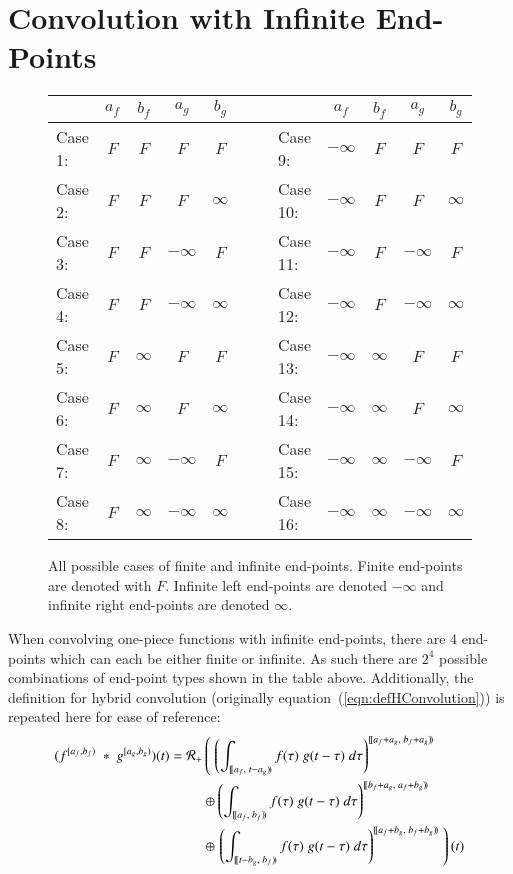 \chapter{Convolution with Infinite End-Points}
\label{chp:16cases}

\begin{figure}[h]
\caption[Possible combinations of finite and infinite end-points]{
	All possible cases of finite and infinite end-points. Finite end-points are denoted with $F$. Infinite left end-points are denoted 	
	$-\infty$ and infinite right end-points are denoted $\infty$.
	\label{fig:16cases}}
\centering
\begin{tabular}{| l || c | c | c | c || r || l ||  c | c | c | c |}
	\hline
		& $a_f$		& $b_f$		& $a_g$		& $b_g$	&$\;\;\;\;$&	& $a_f$		& $b_f$		& $a_g$		& $b_g$	\\
	\hline 
Case 1:	& $F$		& $F$		& $F$		& $F$	&&	Case 9:	& $-\infty$	& $F$		& $F$		& $F$	\\
Case 2:	& $F$		& $F$		& $F$		& $\infty$&&	Case 10:	& $-\infty$	& $F$		& $F$		& $\infty$ \\
Case 3:	& $F$		& $F$		& $-\infty$	& $F$	&&	Case 11:	& $-\infty$	& $F$		& $-\infty$	& $F$	\\
Case 4:	& $F$		& $F$		& $-\infty$	& $\infty$&&	Case 12:	& $-\infty$	& $F$		& $-\infty$	& $\infty$ \\
Case 5:	& $F$		& $\infty$	& $F$		& $F$	&&	Case 13:	& $-\infty$	& $\infty$	& $F$		& $F$	\\
Case 6:	& $F$		& $\infty$ 	& $F$		& $\infty$&&	Case 14:	& $-\infty$	& $\infty$ 	& $F$		& $\infty$ \\
Case 7:	& $F$		& $\infty$ 	& $-\infty$	& $F$	&&	Case 15:	& $-\infty$	& $\infty$ 	& $-\infty$	& $F$	\\
Case 8:	& $F$		& $\infty$ 	& $-\infty$	& $\infty$&&	Case 16:	& $-\infty$	& $\infty$ 	& $-\infty$	& $\infty$ \\
	\hline
\end{tabular}
\end{figure}

When convolving one-piece functions with infinite end-points, there are 4 end-points which can each be either finite or infinite.
As such there are $2^4$ possible combinations of end-point types shown in the table above.
Additionally, the definition for hybrid convolution (originally equation~(\ref{eqn:defHConvolution})) is repeated here for
ease of reference:
\begin{align}
	\label{eqn:defHConvolution2}
	(f^{[a_f,b_f)} \;*\; g^{[a_g,b_g)}) (t) = 
		\R[+] &\left( \; \left( 
			\int_{[\![a_f,\;t-a_g)\!)} f(\tau) \; g(t-\tau) \; d\tau \right)^{[\![a_f+a_g,\; b_f+a_g)\!)} 
				\right. \notag \\ &\oplus \left( 
			\int_{[\![a_f,\;b_f)\!)} f(\tau) \; g(t-\tau) \; d\tau \right)^{[\![b_f+a_g,\; a_f+b_g)\!)} 
				\notag \\ &\oplus \left. \left( 
			\int_{[\![t-b_g,\;b_f)\!)} f(\tau) \; g(t-\tau) \; d\tau \right)^{[\![a_f+b_g,\; b_f+b_g)\!)} 
				\; \right)(t)
\end{align}



